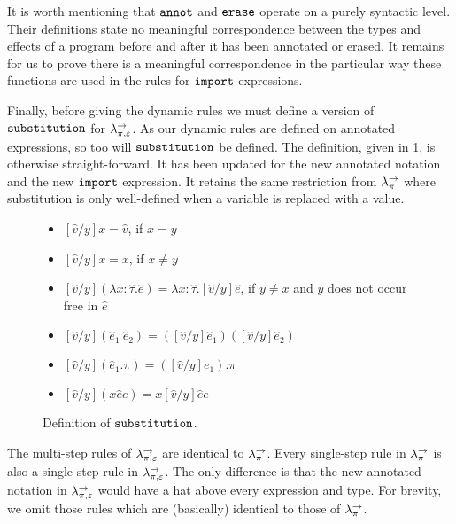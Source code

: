 It is worth mentioning that $\mathtt{annot}$ and $\mathtt{erase}$ operate on a purely syntactic level. Their definitions state no meaningful correspondence between the types and effects of a program before and after it has been annotated or erased. It remains for us to prove there is a meaningful correspondence in the particular way these functions are used in the rules for $\mathtt{import}$ expressions.

Finally, before giving the dynamic rules we must define a version of $\mathtt{substitution}$ for $\lambda^{\rightarrow}_{\pi, \varepsilon}$. As our dynamic rules are defined on annotated expressions, so too will $\mathtt{substitution}$ be defined. The definition, given in \ref{fig:epscalc_defn}, is otherwise straight-forward. It has been updated for the new annotated notation and the new $\mathtt{import}$ expression. It retains the same restriction from $\lambda^{\rightarrow}_{\pi}$ where substitution is only well-defined when a variable is replaced with a value. 

\begin{figure}[h]


\begin{itemize}
	\setlength\itemsep{-0.7em}
	\item[] $[\hat v/y]x = \hat v$, if $x = y$
	\item[] $[\hat v/y]x = x$, if $x \neq y$
	\item[] $[\hat v/y](\lambda x: \hat \tau. \hat e) = \lambda x: \hat \tau.[\hat v/y]\hat e$, if $y \neq x$ and $y$ does not occur free in $\hat e$
	\item[] $[\hat v/y](\hat e_1~\hat e_2) = ([\hat v/y]\hat e_1)([\hat v/y]\hat e_2)$
	\item[] $[\hat v/y](\hat e_1.\pi) = ([\hat v/y]e_1).\pi$
	\item[] $[\hat v/y]({x}{\hat e}{e}) = {x}{[\hat v/y]\hat e}{e}$
\end{itemize}

\vspace{-7pt}
\caption{Definition of $\mathtt{substitution}$.}
\label{fig:epscalc_defn}
\end{figure}

The multi-step rules of $\lambda^{\rightarrow}_{\pi, \varepsilon}$ are identical to $\lambda^{\rightarrow}_{\pi}$. Every single-step rule in $\lambda^{\rightarrow}_{\pi}$ is also a single-step rule in $\lambda^{\rightarrow}_{\pi, \varepsilon}$. The only difference is that the new annotated notation in $\lambda^{\rightarrow}_{\pi, \varepsilon}$ would have a hat above every expression and type. For brevity, we omit those rules which are (basically) identical to those of $\lambda^{\rightarrow}_{\pi}$.

